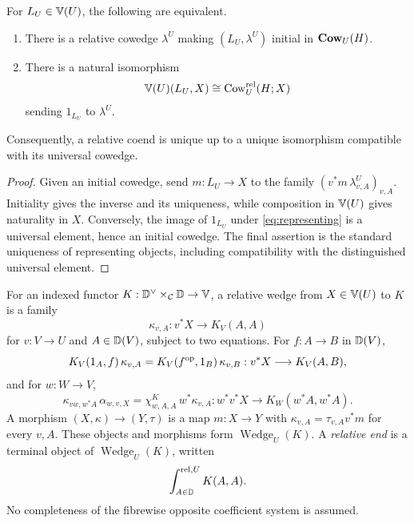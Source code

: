 \begin{proposition}
\label{prop:representing}
For \(L_U\in\mathbb{V}(U)\), the following are equivalent.
\begin{enumerate}
  \item There is a relative cowedge \(\lambda^U\) making
        \((L_U,\lambda^U)\) initial in \(\mathbf{Cow}_U(H)\).
  \item There is a natural isomorphism
  \begin{equation}
    \mathbb{V}(U)(L_U,X)\cong\operatorname{Cow}^{\mathrm{rel}}_U(H;X)
    \label{eq:representing}
  \end{equation}
  sending \(1_{L_U}\) to \(\lambda^U\).
\end{enumerate}
Consequently, a relative coend is unique up to a unique isomorphism
compatible with its universal cowedge.
\end{proposition}

\begin{proof}
Given an initial cowedge, send \(m:L_U\to X\) to the family
\((v^*m\,\lambda^U_{v,A})_{v,A}\).  Initiality gives the inverse and its
uniqueness, while composition in \(\mathbb{V}(U)\) gives naturality in \(X\).
Conversely, the image of \(1_{L_U}\) under \cref{eq:representing} is a
universal element, hence an initial cowedge.  The final assertion is the
standard uniqueness of representing objects, including compatibility with
the distinguished universal element.
\end{proof}

\begin{definition}
\label{def:relative-end}
For an indexed functor \(K:\mathbb{D}^{\vee}\times_{\mathcal{C}}\mathbb{D}\to\mathbb{V}\), a relative wedge
from \(X\in\mathbb{V}(U)\) to \(K\) is a family
\[
  \kappa_{v,A}:v^*X\longrightarrow K_V(A,A)
\]
for \(v:V\to U\) and \(A\in\mathbb{D}(V)\), subject to two equations.  For
\(f:A\to B\) in \(\mathbb{D}(V)\),
\begin{equation}
  K_V(1_A,f)\,\kappa_{v,A}
  =K_V(f^{\mathrm{op}},1_B)\,\kappa_{v,B}
  :v^*X\longrightarrow K_V(A,B),
  \label{eq:wedge-dinaturality}
\end{equation}
and for \(w:W\to V\),
\begin{equation}
  \kappa_{vw,w^*A}\,\alpha_{w,v,X}
  =\chi^K_{w,A,A}\,w^*\kappa_{v,A}
  :w^*v^*X\longrightarrow K_W(w^*A,w^*A).
  \label{eq:wedge-base-coherence}
\end{equation}
A morphism \((X,\kappa)\to(Y,\tau)\) is a map \(m:X\to Y\) with
\(\kappa_{v,A}=\tau_{v,A}v^*m\) for every \(v,A\).  These objects and
morphisms form \(\operatorname{Wedge}_U(K)\).  A \emph{relative end} is a
terminal object of \(\operatorname{Wedge}_U(K)\), written
\[
  \mathop{\int_{A\in\mathbb{D}}^{\mathrm{rel},U}}K(A,A).
\]
No completeness of the fibrewise opposite coefficient system is assumed.
\end{definition}


